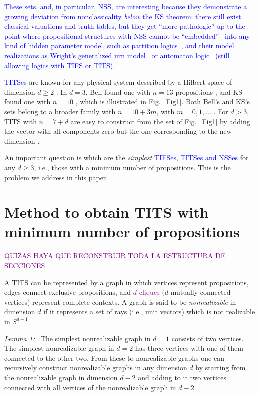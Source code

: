\documentclass[%
  twocolumn,
 showpacs,
 showkeys,
 preprintnumbers,
 amsmath,amssymb,
 aps,
  pra,
  longbibliography,
 floatfix,
 ]{revtex4-1}
\newcommand{\karl}[1]{\textcolor{blue}{#1}}
\newcommand{\jr}[1]{\textcolor{purple}{#1}}
\begin{document}
\karl{These sets, and, in particular, NSS, are interesting because they demonstrate
a growing deviation from nonclassicality {\em below} the KS theorem:
there still exist classical valuations and truth tables, but they get ``more pathologic''
up to the point where propositional structures with NSS cannot
be ``embedded''~\cite{KS67} into any kind of hidden parameter model, such as partition logics~\cite{svozil-2001-eua},
and their model realizations as Wright's generalized urn model~\cite{wright} or automaton logic~\cite{schaller-96}
(still allowing logics with TIFS or TITS).}

\karl{TITSes} are known for any physical system described by a Hilbert space of dimension $d \ge 2$ \cite{code2, code3, code4}. In $d=3$, Bell found one with $n= 13$ propositions \cite{code3}, and KS found one with $n=10$ \cite{code2, code3, code4}, which is illustrated in Fig.~\ref{Fig1}. Both Bell's and KS's sets belong to a broader family with $n=10+3m$, with $m=0,1,\ldots$ \cite{code7}. For $d>3$, TITS with $n=7+d$ are easy to construct from the set of Fig.~\ref{Fig1} by adding the vector with all components zero but the one corresponding to the new dimension \cite{code9}.

An important question is which are the {\em simplest} \karl{TIFSes, TITSes and NSSes} for any $d \ge 3$, i.e., those with a minimum number of propositions. This is the problem we address in this paper.


\section{Method to obtain TITS with minimum number of propositions}


\jr{QUIZAS HAYA QUE RECONSTRUIR TODA LA ESTRUCTURA DE SECCIONES}

A TITS can be represented by a graph in which vertices represent propositions, edges connect exclusive propositions,
and \jr{$d$-cliques (}$d$ mutually connected vertices\jr{)} represent complete contexts. A graph is said to be \emph{nonrealizable}
in dimension $d$ if it represents a set of rays (i.e., unit vectors) which is not realizable in $S^{d-1}.$


{\em Lemma 1:~}\cite{code21,SP15} The simplest nonrealizable graph in $d=1$ consists of two vertices.
The simplest nonrealizable graph in $d=2$ has three vertices with one of them connected to the other two.
From these to nonrealizable graphs one can recursively construct nonrealizable graphs
in any dimension $d$ by starting from the nonrealizable graph in dimension $d-2$
and adding to it two vertices connected with all vertices of the nonrealizable graph in $d-2$.
\end{document}
